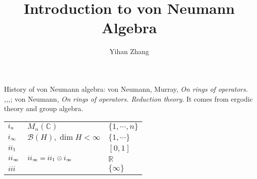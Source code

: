 \documentclass[12pt]{article}
\begin{document}
\title{Introduction to von Neumann Algebra}
\author{Yihan Zhang}
\maketitle

\bigskip

History of von Neumann algebra: von Neumann, Murray, \textit{On rings of operators. \uppercase\expandafter{},\uppercase\expandafter{},\uppercase\expandafter{},\uppercase\expandafter{}}; von Neumann, \textit{On rings of operators. Reduction theory}. It comes from ergodic theory and group algebra.

\begin{tabular}{lll}
$\uppercase\expandafter{\romannumeral 1}_n$ & $M_n(\mathbb C)$ & $\{1,\cdots, n \}$\\
$\uppercase\expandafter{\romannumeral 1}_\infty$ & $\mathcal B(H), \dim H<\infty$&$\{1,\cdots\}$\\
$\uppercase\expandafter{\romannumeral 2}_1$ & & $[0,1]$\\
$\uppercase\expandafter{\romannumeral 2}_\infty$&$\uppercase\expandafter{\romannumeral 2}_\infty=\uppercase\expandafter{\romannumeral 2}_1\otimes\uppercase\expandafter{\romannumeral 1}_\infty$&$\mathbb R$\\
$\uppercase\expandafter{\romannumeral 3}$&&$\{\infty\}$\\
\end{tabular}
\end{document}
